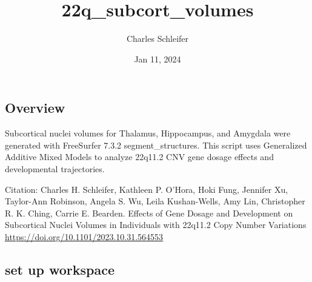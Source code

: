 \documentclass[
]{article}
\title{22q\_subcort\_volumes}
\author{Charles Schleifer}
\date{Jan 11, 2024}
\begin{document}
\maketitle

\hypertarget{overview}{%
\subsection{Overview}\label{overview}}

Subcortical nuclei volumes for Thalamus, Hippocampus, and Amygdala were
generated with FreeSurfer 7.3.2 segment\_structures. This script uses
Generalized Additive Mixed Models to analyze 22q11.2 CNV gene dosage
effects and developmental trajectories.

Citation: Charles H. Schleifer, Kathleen P. O'Hora, Hoki Fung, Jennifer
Xu, Taylor-Ann Robinson, Angela S. Wu, Leila Kushan-Wells, Amy Lin,
Christopher R. K. Ching, Carrie E. Bearden. Effects of Gene Dosage and
Development on Subcortical Nuclei Volumes in Individuals with 22q11.2
Copy Number Variations \url{https://doi.org/10.1101/2023.10.31.564553}

\hypertarget{set-up-workspace}{%
\subsection{set up workspace}\label{set-up-workspace}}
\end{document}
